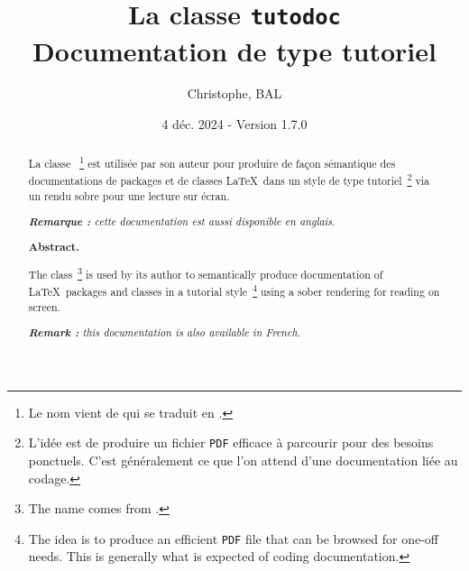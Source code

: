 \title{La classe \texttt{tutodoc} \\ Documentation de type tutoriel}
\author{Christophe, BAL}
\date{4 déc. 2024 - Version 1.7.0}

\maketitle

\begin{abstract}
    La classe \thisproj{}\,%
    \footnote{
        Le nom vient de  qui se traduit en .
    }
    est utilisée par son auteur pour produire de façon sémantique des documentations de packages et de classes \LaTeX\ dans un style de type tutoriel\,%
    \footnote{
        L'idée est de produire un fichier \texttt{PDF} efficace à parcourir pour des besoins ponctuels. C'est généralement ce que l'on attend d'une documentation liée au codage.
    }
    via un rendu sobre pour une lecture sur écran.

    \smallskip

    \noindent
    \emph{\textbf{Remarque :} cette documentation est aussi disponible en anglais.}

    \smallskip
    \tdocsep
    \small
    \itshape
    \vspace{-5pt}
    \begin{center}
        \textbf{Abstract.}
    \end{center}

    The \thisproj{} class\,%
        \footnote{
            The name comes from .
        }
        is used by its author to semantically produce documentation of \LaTeX\ packages and classes in a tutorial style\,%
        \footnote{
            The idea is to produce an efficient \texttt{PDF} file that can be browsed for one-off needs. This is generally what is expected of coding documentation.
        }
        using a sober rendering for reading on screen.
    
        \smallskip
    
        \noindent
        \emph{\textbf{Remark :} this documentation is also available in French.}
\end{abstract}

\tdocsep

